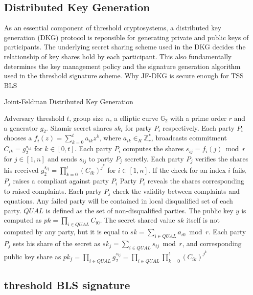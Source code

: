 \documentclass[11pt]{article}
\begin{document}
\subsection{Distributed Key Generation}

As an essential component of threshold cryptosystems, a distributed key generation (DKG) protocol is reponsible for generating private and public keys of participants. The underlying secret sharing scheme used in the DKG decides the relationship of key shares hold by each participant. This also fundamentally determines the key management policy and the signature generation algorithm used in the threshold signature scheme. Why JF-DKG is secure enough for TSS BLS

\begin{algorithm}
\caption{Joint-Feldman Distributed Key Generation\cite{gennaro2007secure}}\label{alg:JFDKG}
\begin{algorithmic}[1]
\Require Adversary threshold $t$, group size $n$, a elliptic curve $\mathbb{G}_2$ with a prime order $r$ and a generator $g_2$.
\Ensure Shamir secret shares $sk_i$ for party $P_i$ respectively.
\State Each party $P_i$ chooses a $f_i(z) = \sum_{k=0}^t a_{ik}z^{k}$, where $a_{ik} \in_R \mathbb{Z}_r^*$, broadcasts commitment $C_{ik} = g_2^{a_{ik}}$ for $k \in [0,t]$. Each party $P_i$ computes the shares $s_{ij} = f_i(j) \bmod r$ for $j \in [1,n]$ and sends $s_{ij}$ to party $P_j$ secretly.
\State Each party $P_j$ verifies the shares his received $g_2^{s_{ij}} = \prod_{k=0}^t(C_{ik})^{j^k}$ for $i \in [1,n]$. If the check for an index $i$ fails, $P_j$ raises a compliant against party $P_i$
\State Party $P_i$ reveals the shares corresponding to raised complaints. Each party $P_j$ check the validity between complaints and equations. Any failed party will be contained in local disqualified set of each party. $QUAL$ is defined as the set of non-disqualified parties.
\State The public key $y$ is computed as $pk = \prod_{i\in QUAL} C_{i0}$. The secret shared value $sk$ itself is not computed by any party, but it is equal to $sk = \sum_{i \in QUAL} a_{i0} \bmod r$. Each party $P_j$ sets his share of the secret as $sk_j = \sum_{i\in QUAL} s_{ij} \bmod r$, and corresponding public key share as $pk_j = \prod_{i \in QUAL} g_2^{s_{ij}} = \prod_{i \in QUAL} \prod_{k=0}^t (C_{ik})^{j^k}$
\end{algorithmic}
\end{algorithm}

\subsection{threshold BLS signature}
\end{document}
